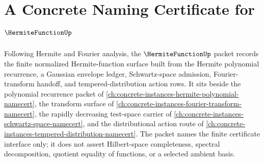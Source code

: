 \chapter{A Concrete Naming Certificate for $\HermiteFunctionUp$}
\label{ch:concrete-instances-hermite-function-namecert}

Following Hermite and Fourier analysis, the $\HermiteFunctionUp$ packet records the finite normalized Hermite-function surface built from the Hermite polynomial recurrence, a Gaussian envelope ledger, Schwartz-space admission, Fourier-transform handoff, and tempered-distribution action rows. It sits beside the polynomial recurrence packet of \autoref{ch:concrete-instances-hermite-polynomial-namecert}, the transform surface of \autoref{ch:concrete-instances-fourier-transform-namecert}, the rapidly decreasing test-space carrier of \autoref{ch:concrete-instances-schwartz-space-namecert}, and the distributional action route of \autoref{ch:concrete-instances-tempered-distribution-namecert}. The packet names the finite certificate interface only; it does not assert Hilbert-space completeness, spectral decomposition, quotient equality of functions, or a selected ambient basis.

